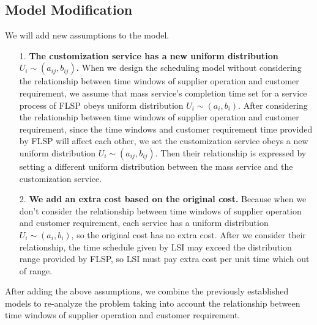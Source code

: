 \documentclass{llncs}
\begin{document}
    \subsection{Model Modification}\label{Sec-4.1}
    We will add new assumptions to the model.
    \begin{itemize}
        \item[1.]
        \textbf{The customization service has a new uniform distribution $U_i\sim(a_{ij},b_{ij})$.} When we design the scheduling model without considering the relationship between time windows of supplier operation and customer requirement, we assume that mass service's completion time set for a service process of FLSP obeys uniform distribution $U_i\sim(a_i,b_i)$. After considering the relationship between time windows of supplier operation and customer requirement, since the time windows and customer requirement time provided by FLSP will affect each other, we set the customization service obeys a new uniform distribution $U_i\sim(a_{ij},b_{ij})$. Then their relationship is expressed by setting a different uniform distribution between the mass service and the customization service.
        \item[2.]
        \textbf{We add an extra cost based on the original cost.} Because when we don't consider the relationship between time windows of supplier operation and customer requirement, each service has a uniform distribution $U_i\sim(a_i,b_i)$, so the original cost has no extra cost. After we consider their relationship, the time schedule given by LSI may exceed the distribution range provided by FLSP, so LSI must pay extra cost per unit time which out of range.
    \end{itemize}
    After adding the above assumptions, we combine the previously established models to re-analyze the problem taking into account the relationship between time windows of supplier operation and customer requirement.
\end{document}
